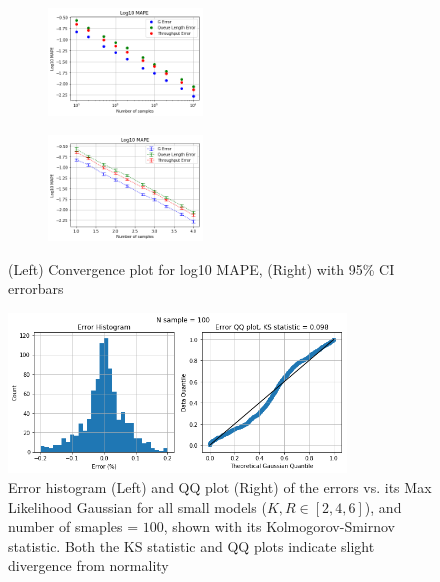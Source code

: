 \begin{figure}[!htb]
\begin{center}
\begin{subfigure}
    \centering
    \includegraphics[width=0.45\textwidth]{Chap6_EvaluationAndAnalysis/images/OverallConvergence.png}
\end{subfigure}
\begin{subfigure}
    \centering
    \includegraphics[width=0.45\textwidth]{Chap6_EvaluationAndAnalysis/images/OverallConvergenceSigma.png}
\end{subfigure}
\caption{(Left) Convergence plot for log10 MAPE, (Right) with 95\% CI errorbars}
\label{fig:OverallConvergence}
\end{center}
\end{figure}

\begin{figure}[!htb]
\begin{center}
    \centering
    \includegraphics[width=0.8\textwidth]{Chap6_EvaluationAndAnalysis/images/N100_KR246.png}    
\caption{Error histogram (Left) and QQ plot (Right) of the errors vs. its Max Likelihood Gaussian for all small models (\(K,R \in [2,4,6]\)), and number of smaples = \(100\), shown with its Kolmogorov-Smirnov statistic. Both the KS statistic and QQ plots indicate slight divergence from normality}
\label{fig:ErrorHistN100_KR246}
\end{center}
\end{figure}

